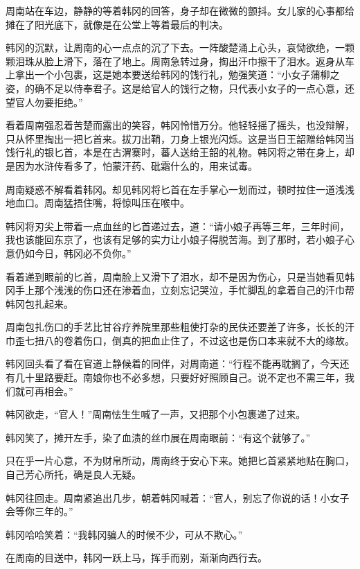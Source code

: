 周南站在车边，静静的等着韩冈的回答，身子却在微微的颤抖。女儿家的心事都给摊在了阳光底下，就像是在公堂上等着最后的判决。

韩冈的沉默，让周南的心一点点的沉了下去。一阵酸楚涌上心头，哀恸欲绝，一颗颗泪珠从脸上滑下，落在了地上。周南急转过身，掏出汗巾擦干了泪水。返身从车上拿出一个小包裹，这是她本要送给韩冈的饯行礼，勉强笑道：“小女子蒲柳之姿，的确不足以侍奉君子。这是给官人的饯行之物，只代表小女子的一点心意，还望官人勿要拒绝。”

看着周南强忍着苦楚而露出的笑容，韩冈怜惜万分。他轻轻摇了摇头，也没辩解，只从怀里掏出一把匕首来。拔刀出鞘，刀身上银光闪烁。这是当日王韶赠给韩冈当饯行礼的银匕首，本是在古渭寨时，蕃人送给王韶的礼物。韩冈将之带在身上，却是因为水浒传看多了，怕蒙汗药、砒霜什么的，用来试毒。

周南疑惑不解看着韩冈。却见韩冈将匕首在左手掌心一划而过，顿时拉住一道浅浅地血口。周南猛捂住嘴，将惊叫压在喉中。

韩冈将刃尖上带着一点血丝的匕首递过去，道：“请小娘子再等三年，三年时间，我也该能回东京了，也该有足够的实力让小娘子得脱苦海。到了那时，若小娘子心意仍如今日，韩冈必不负你。”

看着递到眼前的匕首，周南脸上又滑下了泪水，却不是因为伤心，只是当她看见韩冈手上那个浅浅的伤口还在渗着血，立刻忘记哭泣，手忙脚乱的拿着自己的汗巾帮韩冈包扎起来。

周南包扎伤口的手艺比甘谷疗养院里那些粗使打杂的民伕还要差了许多，长长的汗巾歪七扭八的卷着伤口，倒真的把血止住了，不过这也是伤口本来就不大的缘故。

韩冈回头看了看在官道上静候着的同伴，对周南道：“行程不能再耽搁了，今天还有几十里路要赶。南娘你也不必多想，只要好好照顾自己。说不定也不需三年，我们就可再相会。”

韩冈欲走，“官人！”周南怯生生喊了一声，又把那个小包裹递了过来。

韩冈笑了，摊开左手，染了血渍的丝巾展在周南眼前：“有这个就够了。”

只在乎一片心意，不为财帛所动，周南终于安心下来。她把匕首紧紧地贴在胸口，自己芳心所托，确是良人无疑。

韩冈往回走。周南紧追出几步，朝着韩冈喊着：“官人，别忘了你说的话！小女子会等你三年的。”

韩冈哈哈笑着：“我韩冈骗人的时候不少，可从不欺心。”

在周南的目送中，韩冈一跃上马，挥手而别，渐渐向西行去。

